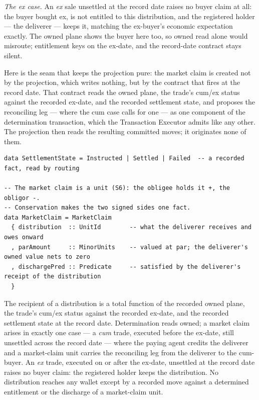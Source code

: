 \emph{The ex case.} An \emph{ex} sale unsettled at the record date raises no buyer
claim at all: the buyer bought ex, is not entitled to this distribution, and the
registered holder --- the deliverer --- keeps it, matching the ex-buyer's economic
expectation exactly. The owned plane shows the buyer here too, so owned read alone
would misroute; entitlement keys on the ex-date, and the record-date contract stays
silent.

Here is the seam that keeps the projection pure: the market claim is created not by the
projection, which writes nothing, but by the contract that fires at the record date.
That contract reads the owned plane, the trade's cum/ex status against the recorded
ex-date, and the recorded settlement state, and proposes the reconciling leg --- where
the cum case calls for one --- as one component of the determination transaction, which
the Transaction Executor admits like any other. The projection then reads the resulting
committed moves; it originates none of them.

\begin{lstlisting}
data SettlementState = Instructed | Settled | Failed  -- a recorded fact, read by routing

-- The market claim is a unit (S6): the obligee holds it +, the obligor -.
-- Conservation makes the two signed sides one fact.
data MarketClaim = MarketClaim
  { distribution  :: UnitId        -- what the deliverer receives and owes onward
  , parAmount     :: MinorUnits    -- valued at par; the deliverer's owned value nets to zero
  , dischargePred :: Predicate     -- satisfied by the deliverer's receipt of the distribution
  }
\end{lstlisting}

\begin{proposition}
The recipient of a distribution is a total function of the recorded owned plane, the
trade's cum/ex status against the recorded ex-date, and the recorded settlement state
at the record date. Determination reads owned; a market claim arises in exactly one
case --- a \emph{cum} trade, executed before the ex-date, still unsettled across the
record date --- where the paying agent credits the deliverer and a market-claim unit
carries the reconciling leg from the deliverer to the cum-buyer. An \emph{ex} trade,
executed on or after the ex-date, unsettled at the record date raises no buyer claim:
the registered holder keeps the distribution. No distribution reaches any wallet except
by a recorded move against a determined entitlement or the discharge of a market-claim
unit.
\end{proposition}

